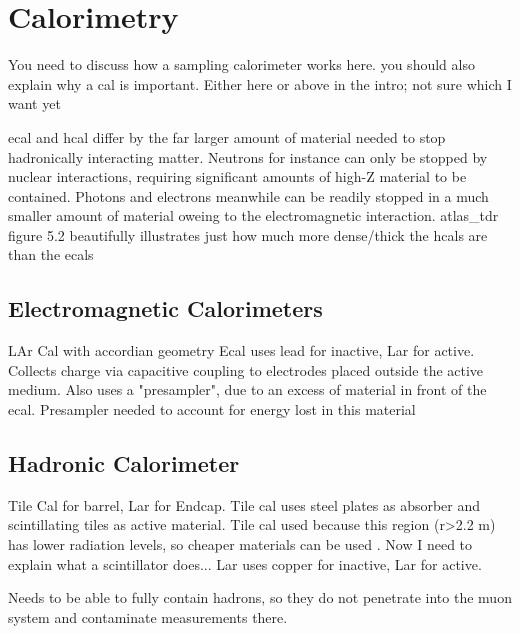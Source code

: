 

\section{Calorimetry} %
    You need to discuss how a sampling calorimeter works here.
    you should also explain why a cal is important. Either here or above in the intro; not sure which I want yet

    ecal and hcal differ by the far larger amount of material needed to stop hadronically interacting matter.
    Neutrons for instance can only be stopped by nuclear interactions, requiring significant amounts of high-Z material to be contained. \cite{energy_measurement}
    Photons and electrons meanwhile can be readily stopped in a much smaller amount of material oweing to the electromagnetic interaction.
    atlas_tdr figure 5.2 beautifully illustrates just how much more dense/thick the hcals are than the ecals



    \subsection{Electromagnetic Calorimeters}
        LAr Cal with accordian geometry
        Ecal uses lead for inactive, Lar for active.
        Collects charge via capacitive coupling to electrodes placed outside the active medium.
        Also uses a "presampler", due to an excess of material in front of the ecal. Presampler needed to account for energy lost in this material


    \subsection{Hadronic Calorimeter}
        Tile Cal for barrel, Lar for Endcap.
        Tile cal uses steel plates as absorber and scintillating tiles as active material.
        Tile cal used because this region (r>2.2 m) has lower radiation levels, so cheaper materials can be used \cite{Lar_cal_tdr}.
        Now I need to explain what a scintillator does...
        Lar uses copper for inactive, Lar for active.

        Needs to be able to fully contain hadrons, so they do not penetrate into the muon system and contaminate measurements there.


